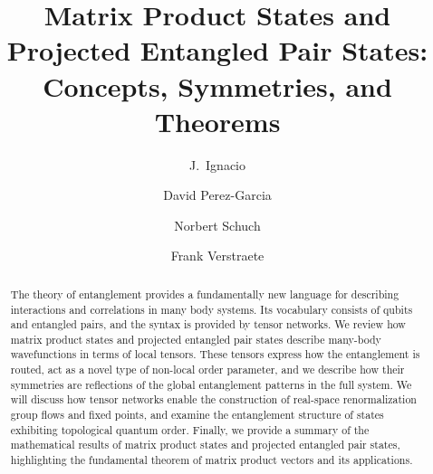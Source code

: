 \documentclass[rmp,aps,reprint,superscriptaddress,nobalancelastpage]{revtex4-1}
\begin{document}
\title{Matrix Product States and Projected Entangled Pair States:
    Concepts, Symmetries, and Theorems}

\author{J.~Ignacio }


\author{David Perez-Garcia}

\author{Norbert Schuch}

\author{Frank Verstraete}


\begin{abstract}
    The theory of entanglement provides a fundamentally new language for describing interactions and correlations in many body systems. Its vocabulary consists of qubits and entangled pairs, and the syntax is provided by tensor networks. We review how matrix product states and projected entangled pair states describe many-body wavefunctions in terms of local tensors. These tensors express how the entanglement is routed, act as a novel type of non-local order parameter, and we describe how their symmetries are reflections of the global entanglement patterns in the full system. We will discuss how tensor networks enable the construction of real-space renormalization group flows and fixed points, and examine the entanglement structure of states exhibiting topological quantum order. Finally, we provide a summary of the mathematical results of matrix product states and projected entangled pair states, highlighting the  fundamental theorem of matrix product vectors and its applications.
\end{abstract}
\end{document}
